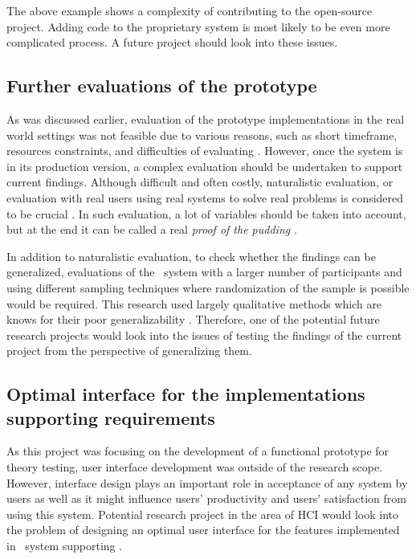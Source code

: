 The above example shows a complexity of contributing to the open-source project.
Adding code to the proprietary system is most likely to be even more complicated
process. A future project should look into these issues.

\subsection{Further evaluations of the prototype}
As was discussed earlier, evaluation of the prototype implementations in the
real world settings was not feasible due to various reasons, such as short
timeframe, resources constraints, and difficulties of evaluating \LLLsn.
However, once the system is in its production version, a complex evaluation
should be undertaken to support current findings. Although difficult and often
costly, naturalistic evaluation, or evaluation with real users using real
systems to solve real problems is considered to be crucial
\citep{Pries-Heje2008}. In such evaluation, a lot of variables should be taken
into account, but at the end it can be called a real \textit{proof of the
pudding} \citep{Venable2010}.

In addition to naturalistic evaluation, to check whether the findings can be
generalized, evaluations of the \ep~system with a larger number of participants
and using different sampling techniques where randomization of the sample is
possible would be required. This research used largely qualitative methods which
are knows for their poor generalizability \citep{Trochim2001}. Therefore, one of
the potential future research projects would look into the issues of testing the
findings of the current project from the perspective of generalizing them.

\subsection[Optimal interface design]{Optimal interface for the implementations
supporting \LLLs requirements} 

As this project was focusing on the development of a functional prototype for
theory testing, user interface development was outside of the research scope.
However, interface design plays an important role in acceptance of any system by
users as well as it might influence users' productivity and users' satisfaction
from using this system. Potential research project in the area of HCI would look
into the problem of designing an optimal user interface for the features
implemented in \ep~system supporting \LLLsn.

